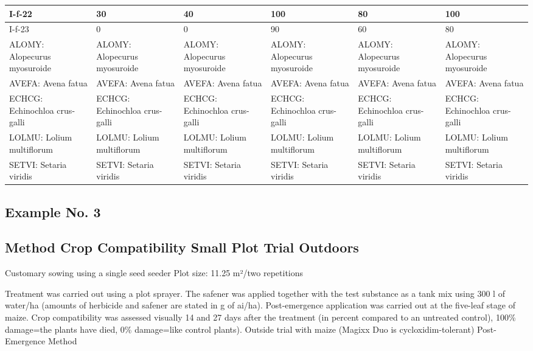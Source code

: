 \documentclass[11pt,a4paper]{article}
\begin{document}
\begin{table}[h]
\begin{tabular}{|l|l|l|l|l|l|}
I-f-22 & 30 & 40 & 100 & 80 & 100 \\ \hline
I-f-23 & 0 & 0 & 90 & 60 & 80 \\ \hline
ALOMY: Alopecurus myosuroide & ALOMY: Alopecurus myosuroide & ALOMY: Alopecurus myosuroide & ALOMY: Alopecurus myosuroide & ALOMY: Alopecurus myosuroide & ALOMY: Alopecurus myosuroide \\ \hline
AVEFA: Avena fatua & AVEFA: Avena fatua & AVEFA: Avena fatua & AVEFA: Avena fatua & AVEFA: Avena fatua & AVEFA: Avena fatua \\ \hline
ECHCG: Echinochloa crus-galli & ECHCG: Echinochloa crus-galli & ECHCG: Echinochloa crus-galli & ECHCG: Echinochloa crus-galli & ECHCG: Echinochloa crus-galli & ECHCG: Echinochloa crus-galli \\ \hline
LOLMU: Lolium multiflorum & LOLMU: Lolium multiflorum & LOLMU: Lolium multiflorum & LOLMU: Lolium multiflorum & LOLMU: Lolium multiflorum & LOLMU: Lolium multiflorum \\ \hline
SETVI: Setaria viridis & SETVI: Setaria viridis & SETVI: Setaria viridis & SETVI: Setaria viridis & SETVI: Setaria viridis & SETVI: Setaria viridis \\ \hline
\end{tabular}
\end{table}

\subsection{Example No. 3}

\subsection{Method Crop Compatibility Small Plot Trial Outdoors}

Customary sowing using a single seed seeder Plot size: 11.25 m²/two repetitions

Treatment was carried out using a plot sprayer. The safener was applied together with the test substance as a tank mix using 300 l of water/ha (amounts of herbicide and safener are stated in g of ai/ha). Post-emergence application was carried out at the five-leaf stage of maize. Crop compatibility was assessed visually 14 and 27 days after the treatment (in percent compared to an untreated control), 100\% damage=the plants have died, 0\% damage=like control plants). Outside trial with maize (Magixx Duo is cycloxidim-tolerant) Post-Emergence Method
\end{document}

